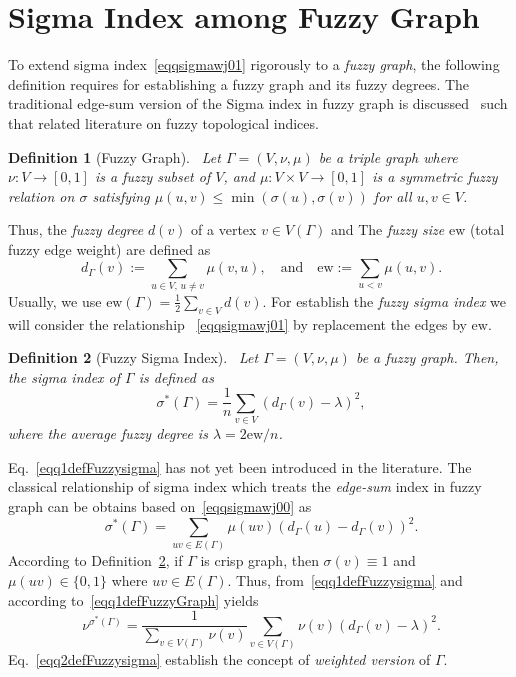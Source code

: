 \documentclass[12pt]{amsart}
\newtheorem{definition}{Definition}
\newcommand{\ew}{\mathrm{ew}}
\newcommand{\SF}{\sigma^*}
\begin{document}
\section{Sigma Index among Fuzzy Graph}
To extend sigma index~\eqref{eqqsigmawj01} rigorously to a \textit{fuzzy graph}, the following definition requires for establishing a fuzzy graph and its fuzzy degrees.
The traditional edge-sum version of the Sigma index in fuzzy graph is discussed~\cite{MordesonMathew2024} such that related literature on fuzzy topological indices.
\begin{definition}[Fuzzy Graph\cite{MordesonMathew2024}]~\label{defFuzzyGraph}
Let $\Gamma=(V, \nu,\mu)$ be a triple graph where $\nu: V \to [0,1]$ is a fuzzy subset of $V$, and $\mu: V \times V \to [0,1]$ is a symmetric fuzzy relation on $\sigma$ satisfying 
    $\mu(u,v) \le \min(\sigma(u),\sigma(v))$ for all $u,v \in V$.
\end{definition}
Thus, the \textit{fuzzy degree} $d(v)$ of a vertex $v \in V(\Gamma)$ and The \textit{fuzzy size} $\mathrm{ew}$ (total fuzzy edge weight) are defined as 
\begin{equation}~\label{eqq1defFuzzyGraph}
d_\Gamma(v):= \sum_{u \in V,\, u \neq v} \mu(v,u), \quad \text{and} \quad \mathrm{ew}:= \sum_{u < v} \mu(u,v).
\end{equation}
Usually, we use $\mathrm{ew}(\Gamma)=\frac{1}{2} \sum_{v \in V} d(v)$.
For establish the \textit{fuzzy sigma index} we will consider the relationship ~\eqref{eqqsigmawj01} by replacement the edges by $\mathrm{ew}$.
\begin{definition}[Fuzzy Sigma Index]~\label{defFuzzysigma}
Let $\Gamma=(V, \nu,\mu)$ be a fuzzy graph. Then, the sigma index of $\Gamma$ is defined as
\begin{equation}~\label{eqq1defFuzzysigma}
\sigma^*(\Gamma) = \frac{1}{n} \sum_{v \in V} \left( d_\Gamma(v)-\lambda \right)^2, 
\end{equation}
where  the average fuzzy degree is $\lambda=2\ew/n$.
\end{definition}
Eq.~\eqref{eqq1defFuzzysigma} has not yet been introduced in the literature. 
The classical relationship of sigma index which treats the \emph{edge-sum} index in fuzzy graph can be obtains based on~\eqref{eqqsigmawj00} as 
\begin{equation}~\label{eqq01defFuzzysigma}
\SF(\Gamma)=\sum_{uv\in E(\Gamma)} \mu(uv)\left(d_\Gamma(u)-d_\Gamma(v)\right)^2.
\end{equation}
According to Definition~\ref{defFuzzysigma}, if $\Gamma$ is crisp graph, then $\sigma(v) \equiv 1$ and $\mu(uv) \in \{0,1\}$ where $uv\in E(\Gamma)$. Thus, from~\eqref{eqq1defFuzzysigma} and according to~\eqref{eqq1defFuzzyGraph} yields  
\begin{equation}~\label{eqq2defFuzzysigma}
\nu^{\SF(\Gamma)}=\frac{1}{\sum_{v \in V(\Gamma)} \nu(v)} \sum_{v \in V(\Gamma)} \nu(v) \left( d_\Gamma(v) -\lambda \right)^2.
\end{equation}
Eq.~\eqref{eqq2defFuzzysigma} establish the concept of \textit{weighted version} of $\Gamma$.  
\end{document}
